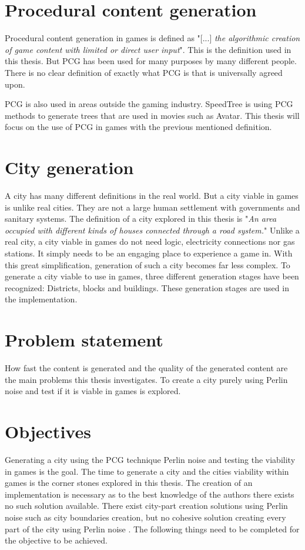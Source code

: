 	\section{Procedural content generation}
	Procedural content generation in games is defined as "[...] \textit{the algorithmic creation of game content with limited or direct user input}"\cite{WhatIsPCG}. This is the definition used in this thesis. But PCG has been used for many purposes by many different people. There is no clear definition of exactly what PCG is that is universally agreed upon\cite{WhatIsPCG}.
	
	PCG is also used in areas outside the gaming industry. SpeedTree\cite{SpeedTree} is using PCG methods to generate trees that are used in movies such as Avatar\cite{SpeedTreeMovies}.
	This thesis will focus on the use of PCG in games with the previous mentioned definition.
	
	\section{City generation}
	A city has many different definitions in the real world. But a city viable in games is unlike real cities. They are not a large human settlement with governments and sanitary systems. The definition of a city explored in this thesis is "\textit{An area occupied with different kinds of houses connected through a road system.}"
	Unlike a real city, a city viable in games do not need logic, electricity connections nor gas stations. It simply needs to be an engaging place to experience a game in. With this great simplification, generation of such a city becomes far less complex.
	To generate a city viable to use in games, three different generation stages have been recognized: Districts, blocks and buildings. These generation stages are used in the implementation.
	
	\section{Problem statement}
	How fast the content is generated and the quality of the generated content are the main problems this thesis investigates.
	To create a city purely using Perlin noise and test if it is viable in games is explored.
	
	\section{Objectives}
	Generating a city using the PCG technique Perlin noise and testing the viability in games is the goal. The time to generate a city and the cities viability within games is the corner stones explored in this thesis. The creation of an implementation is necessary as to the best knowledge of the authors there exists no such solution available.
	There exist city-part creation solutions using Perlin noise such as city boundaries creation, but no cohesive solution creating every part of the city using Perlin noise \cite{CityBoundariesPerlin}.
	The following things need to be completed for the objective to be achieved.
	
